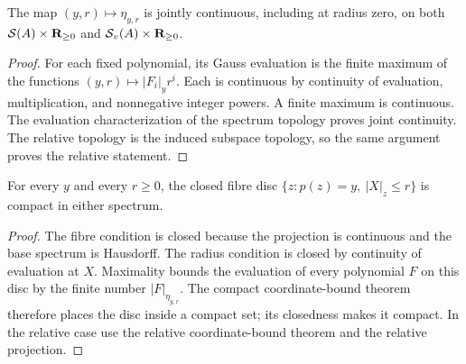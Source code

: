 \begin{lemma}\label{spectrum:gauss-joint-continuity}
\leanok
{}
The map $(y,r)\mapsto\eta_{y,r}$ is jointly continuous, including at radius zero,
on both $\mathcal S(A)\times\mathbf{R}_{\ge0}$ and $\mathcal S_v(A)\times\mathbf{R}_{\ge0}$.
\end{lemma}
\begin{proof}
For each fixed polynomial, its Gauss evaluation is the finite maximum of the
functions $(y,r)\mapsto |F_i|_y r^i$. Each is continuous by continuity of
evaluation, multiplication, and nonnegative integer powers. A finite maximum
is continuous. The evaluation characterization of the spectrum topology proves
joint continuity. The relative topology is the induced subspace topology, so
the same argument proves the relative statement.
\end{proof}

\begin{theorem}\label{spectrum:gauss-compact-fibre-disc}
\leanok
{}
For every $y$ and every $r\ge0$, the closed fibre disc
$\{z:p(z)=y,\ |X|_z\le r\}$ is compact in either spectrum.
\end{theorem}
\begin{proof}
The fibre condition is closed because the projection is continuous and the
base spectrum is Hausdorff. The radius condition is closed by continuity of
evaluation at $X$. Maximality bounds the evaluation of every polynomial $F$
on this disc by the finite number $|F|_{\eta_{y,r}}$.
The compact coordinate-bound theorem therefore places the disc inside a
compact set; its closedness makes it compact. In the relative case use the
relative coordinate-bound theorem and the relative projection.
\end{proof}
